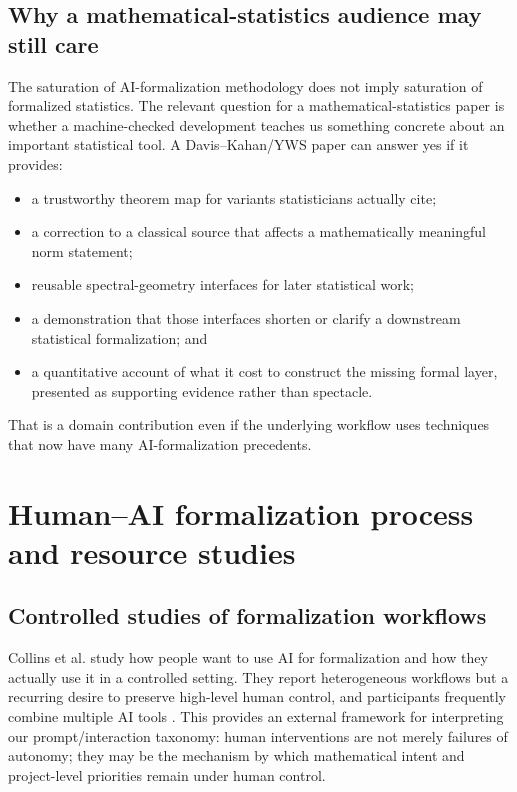 \documentclass[11pt]{article}
\begin{document}
\subsection{Why a mathematical-statistics audience may still care}

The saturation of AI-formalization methodology does not imply saturation of
formalized statistics.  The relevant question for a mathematical-statistics
paper is whether a machine-checked development teaches us something concrete
about an important statistical tool.  A Davis--Kahan/YWS paper can answer yes if
it provides:

\begin{itemize}
  \item a trustworthy theorem map for variants statisticians actually cite;
  \item a correction to a classical source that affects a mathematically
        meaningful norm statement;
  \item reusable spectral-geometry interfaces for later statistical work;
  \item a demonstration that those interfaces shorten or clarify a downstream
        statistical formalization; and
  \item a quantitative account of what it cost to construct the missing formal
        layer, presented as supporting evidence rather than spectacle.
\end{itemize}

That is a domain contribution even if the underlying workflow uses techniques
that now have many AI-formalization precedents.

\section{Human--AI formalization process and resource studies}
\label{sec:process-literature}

\subsection{Controlled studies of formalization workflows}

Collins et al. study how people want to use AI for formalization and how they
actually use it in a controlled setting.  They report heterogeneous workflows
but a recurring desire to preserve high-level human control, and participants
frequently combine multiple AI tools \citep{collins2026humanai}.  This provides
an external framework for interpreting our prompt/interaction taxonomy: human
interventions are not merely failures of autonomy; they may be the mechanism by
which mathematical intent and project-level priorities remain under human
control.
\end{document}
